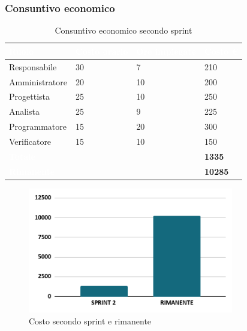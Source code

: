 \newpage
\subsubsection{Consuntivo economico}
{
\setlength{\tabcolsep}{10pt}
\renewcommand{\arraystretch}{1.5}
\begin{table}[h]
    \centering
    \begin{tabularx}{\textwidth}{| l | l | l | X |}
        \hline
        \rowcolor{headerrow} \textbf{\textcolor{white}{Ruolo}} & \textbf{\textcolor{white}{Costo orario}} & \textbf{\textcolor{white}{Ore impiegate}} & \textbf{\textcolor{white}{Costo €}} \\
        \hline
        Responsabile & 30 & 7 & 210\\
        \hline
        Amministratore & 20 & 10 & 200\\
        \hline
        Progettista& 25 & 10 & 250\\
        \hline
        Analista & 25 & 9 & 225\\
        \hline
        Programmatore & 15 & 20 & 300\\
        \hline
        Verificatore & 15 & 10 & 150\\
        \hline
        \cellcolor{headerrow} \textbf{\textcolor{white}{Totale}} &  &  & \textbf{1335}\\
        \hline
        \cellcolor{headerrow} \textbf{\textcolor{white}{Rimanente}} &  &  & \textbf{10285}\\
        \hline
    \end{tabularx}
    \caption{Consuntivo economico secondo sprint}
    \label{tab:consuntivocostisecondoosprint}
\end{table}
}

\begin{figure}[h!]
    \centering
    \includegraphics[width=0.8\textwidth]{cons2costo.png}
    \caption{Costo secondo sprint e rimanente}
    \label{fig:consuntivocostosecondosprint}
\end{figure}

